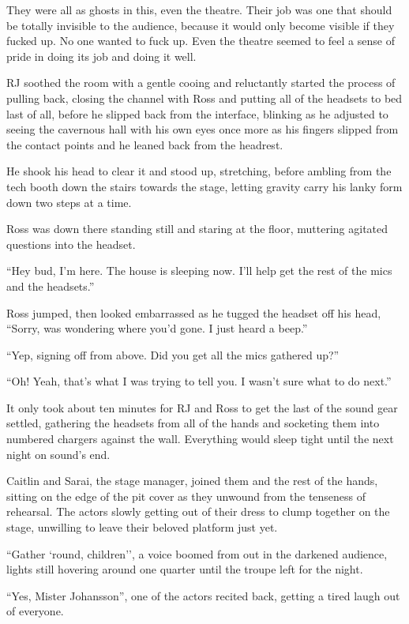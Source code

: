 They were all as ghosts in this, even the theatre.  Their job was one that should be totally invisible to the audience, because it would only become visible if they fucked up.  No one wanted to fuck up.  Even the theatre seemed to feel a sense of pride in doing its job and doing it well.

RJ soothed the room with a gentle cooing and reluctantly started the process of pulling back, closing the channel with Ross and putting all of the headsets to bed last of all, before he slipped back from the interface, blinking as he adjusted to seeing the cavernous hall with his own eyes once more as his fingers slipped from the contact points and he leaned back from the headrest.

He shook his head to clear it and stood up, stretching, before ambling from the tech booth down the stairs towards the stage, letting gravity carry his lanky form down two steps at a time.

Ross was down there standing still and staring at the floor, muttering agitated questions into the headset.

``Hey bud, I'm here.  The house is sleeping now.  I'll help get the rest of the mics and the headsets.''

Ross jumped, then looked embarrassed as he tugged the headset off his head, ``Sorry, was wondering where you'd gone.  I just heard a beep.''

``Yep, signing off from above.  Did you get all the mics gathered up?''

``Oh! Yeah, that's what I was trying to tell you.  I wasn't sure what to do next.''

It only took about ten minutes for RJ and Ross to get the last of the sound gear settled, gathering the headsets from all of the hands and socketing them into numbered chargers against the wall.  Everything would sleep tight until the next night on sound's end.

Caitlin and Sarai, the stage manager, joined them and the rest of the hands, sitting on the edge of the pit cover as they unwound from the tenseness of rehearsal.  The actors slowly getting out of their dress to clump together on the stage, unwilling to leave their beloved platform just yet.

``Gather `round, children'', a voice boomed from out in the darkened audience, lights still hovering around one quarter until the troupe left for the night.

``Yes, Mister Johansson'', one of the actors recited back, getting a tired laugh out of everyone.


